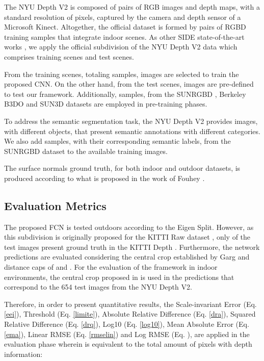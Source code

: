 \documentclass[5p]{elsarticle}
\begin{document}
The NYU Depth V2 \cite{silberman2012indoor} is composed of pairs of RGB images and depth maps, with a standard resolution of  pixels, captured by the camera and depth sensor of a Microsoft Kinect. Altogether, the official dataset is formed by  pairs of RGBD training samples that integrate  indoor scenes. As other SIDE state-of-the-art works \cite{chen2019attention, yin2019enforcing, alhashim2018high}, we apply the official subdivision of the NYU Depth V2 data which comprises  training scenes and  test scenes. 

From the  training scenes, totaling  samples,  images are selected to train the proposed CNN. On the other hand, from the  test scenes,  images are pre-defined to test our framework. Additionally,  samples, from the SUNRGBD \cite{song2015sun}, Berkeley B3DO \cite{janoch2013category} and SUN3D \cite{xiao2013sun3d} datasets are employed in pre-training phases. 

To address the semantic segmentation task, the NYU Depth V2 provides  images, with  different objects, that present semantic annotations with  different categories. We also add  samples, with their corresponding semantic labels, from the SUNRGBD dataset \cite{song2015sun} to the  available training images.  

The surface normals ground truth, for both indoor and outdoor datasets, is produced according to what is proposed in the work of Fouhey \etal\cite{fouhey2013data}.

\subsection{Evaluation Metrics}

The proposed FCN is tested outdoors according to the Eigen Split. However, as this subdivision is originally proposed for the KITTI Raw dataset \cite{geiger2013vision}, only  of the  test images present ground truth in the KITTI Depth \cite{uhrig2017sparsity}. Furthermore, the network predictions are evaluated considering the central crop established by Garg \etal\cite{garg2016unsupervised} and distance caps of  and . For the evaluation of the framework in indoor environments, the central crop proposed in \cite{eigen2014depth} is used in the predictions that correspond to the 654 test images from the NYU Depth V2.

Therefore, in order to present quantitative results, the Scale-invariant Error (Eq. \ref{eei}), Threshold (Eq. \ref{limite}), Absolute Relative Difference (Eq. \ref{dra}), Squared Relative Difference (Eq. \ref{drq}), Log10 (Eq. \ref{log10}), Mean Absolute Error (Eq. \ref{ema}), Linear RMSE (Eq. \ref{rmselin}) and Log RMSE (Eq. ), are applied in the evaluation phase wherein  is equivalent to the total amount of pixels with depth information:
\end{document}
